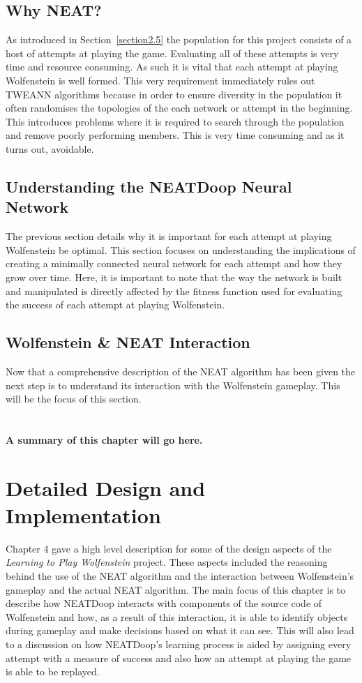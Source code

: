 \documentclass[]{Learning-to-Play-Wolfenstein-thesis}
\begin{document}
\section{Why NEAT?}
As introduced in Section~\ref{section2.5} the population for this project consists of a host of attempts at playing the game. Evaluating all of these attempts is very time and resource consuming. As such it is vital that each attempt at playing Wolfenstein is well formed. This very requirement immediately rules out TWEANN algorithms because in order to ensure diversity in the population it often randomises the topologies of the each network or attempt in the beginning. This introduces problems where it is required to search through the population and remove poorly performing members. This is very time consuming and as it turns out, avoidable.

\section{Understanding the NEATDoop Neural Network}
The previous section details why it is important for each attempt at playing Wolfenstein be optimal. This section focuses on understanding the implications of creating a minimally connected neural network for each attempt and how they grow over time. Here, it is important to note that the way the network is built and manipulated is directly affected by the fitness function used for evaluating the success of each attempt at playing Wolfenstein.

\section{Wolfenstein \& NEAT Interaction}
Now that a comprehensive description of the NEAT algorithm has been given the next step is to understand its interaction with the Wolfenstein gameplay. This will be the focus of this section. \\\\\\\textbf{A summary of this chapter will go here.}

\chapter{\label{Chapter5}Detailed Design and Implementation}%
Chapter 4 gave a high level description for some of the design aspects of the \textit{Learning to Play Wolfenstein} project. These aspects included the reasoning behind the use of the NEAT algorithm and the interaction between Wolfenstein's gameplay and the actual NEAT algorithm. The main focus of this chapter is to describe how NEATDoop interacts with components of the source code of Wolfenstein and how, as a result of this interaction, it is able to identify objects during gameplay and make decisions based on what it can see. This will also lead to a discussion on how NEATDoop's learning process is aided by assigning every attempt with a measure of success and also how an attempt at playing the game is able to be replayed. 
\end{document}
